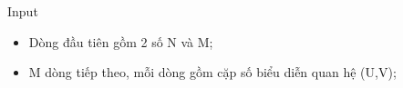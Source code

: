Input
\begin{itemize}
	\item     Dòng đầu tiên gồm 2 số N và M;   
	\item     M dòng tiếp theo, mỗi dòng gồm cặp số biểu diễn quan hệ (U,V);   
\end{itemize}